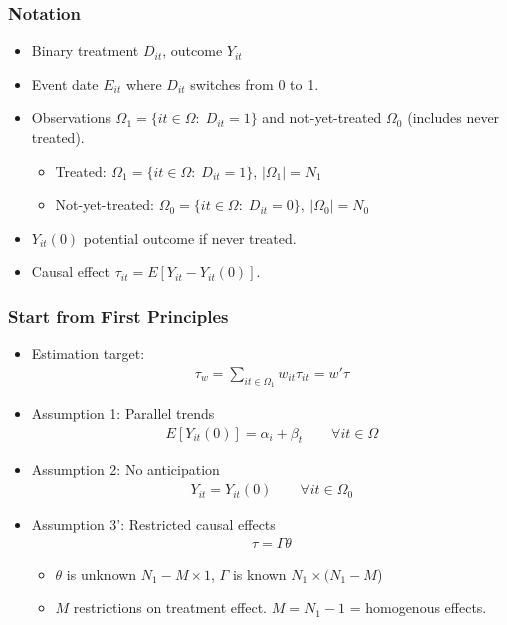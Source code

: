 \documentclass[english,xcolor=svgnames]{beamer}
\begin{document}
\begin{frame}
\frametitle[alignment=center]{Notation}
\begin{itemize}
	\item Binary treatment $D_{it}$, outcome $Y_{it}$
	\item Event date $E_{it}$ where $D_{it}$ switches from 0 to 1.
	\item Observations $\Omega_1=\{it\in \Omega:\; D_{it}=1\}$ and not-yet-treated $\Omega_0$ (includes never treated). 
	\begin{itemize}
		\item Treated: $\Omega_1=\{it\in \Omega:\; D_{it}=1\}$, $|\Omega_1|=N_1$
		\item Not-yet-treated: $\Omega_0=\{it\in \Omega:\; D_{it}=0\}$, $|\Omega_0|=N_0$
	\end{itemize}
	\item $Y_{it}(0)$ potential outcome if never treated.
	\item Causal effect $\tau_{it}=E[Y_{it}-Y_{it}(0)]$.
\end{itemize}
\end{frame}

\begin{frame}
\frametitle[alignment=center]{Start from First Principles}
\begin{itemize}
	\item Estimation target:
	\begin{align*}
		\tau_w = \sum_{it\in\Omega_1} w_{it}\tau_{it} = w'\tau
	\end{align*}
	\item Assumption 1: Parallel trends 
	\begin{align*}
		E[Y_{it}(0)] = \alpha_i + \beta_t \qquad\forall it\in \Omega
	\end{align*}
	\item Assumption 2: No anticipation
	\begin{align*}
		Y_{it}=Y_{it}(0) \qquad\forall it\in \Omega_0
	\end{align*}
	\item Assumption 3': Restricted causal effects
	\begin{align*}
		\tau =\Gamma \theta 
	\end{align*}
	\begin{itemize}
		\item $\theta$ is unknown $N_1-M \times 1$, $\Gamma$ is known $N_1\times (N_1-M$)
		\item $M$ restrictions on treatment effect. $M=N_1-1$ = homogenous effects.
	\end{itemize}
\end{itemize}
\end{frame}
\end{document}
